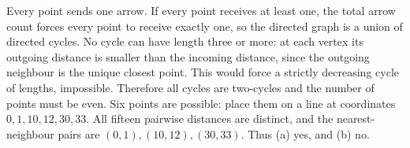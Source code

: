 Every point sends one arrow. If every point receives at least one, the total arrow count forces every point to receive exactly one, so the directed graph is a union of directed cycles. No cycle can have length three or more: at each vertex its outgoing distance is smaller than the incoming distance, since the outgoing neighbour is the unique closest point. This would force a strictly decreasing cycle of lengths, impossible. Therefore all cycles are two-cycles and the number of points must be even. Six points are possible: place them on a line at coordinates $0,1,10,12,30,33$. All fifteen pairwise distances are distinct, and the nearest-neighbour pairs are $(0,1),(10,12),(30,33)$. Thus (a) yes, and (b) no.
